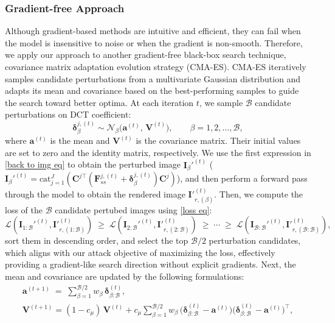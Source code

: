 \documentclass[runningheads]{llncs}
\begin{document}
\subsubsection{Gradient-free Approach}
Although gradient-based methods are intuitive and efficient, they can fail when the model is insensitive to noise or when the gradient is non-smooth. Therefore, we apply our approach to another gradient-free black-box search technique, covariance matrix adaptation evolution strategy (CMA-ES)\cite{hansen2016cma}. CMA-ES iteratively samples candidate perturbations from a multivariate Gaussian distribution and adapts its mean and covariance based on the best-performing samples to guide the search toward better optima. At each iteration $t$, we sample $\mathcal{B}$ candidate perturbations on DCT coefficient:
\begin{equation}
    \bm{\delta}_{\beta}^{j,(t)} \sim \mathcal{N}_\beta\!\bigl(\bm{a}^{(t)},\,\bm{V}^{(t)}\bigr),
\qquad \beta=1,2,\ldots,\mathcal{B},
\end{equation}
where $\bm{a}^{(t)}$ is the mean and $\bm{V}^{(t)}$ is the covariance matrix. Their initial values are set to zero and the identity matrix, respectively. We use the first expression in \cref{back to img eq} to obtain the perturbed image $\bm{I}_\beta'^{(t)}$ ($\bm{I}_\beta'^{(t)}={\text{cat}}_{j=1}^J(\bm{C}^{j\top}(\bm{F}_{ss}^{j,(t)}+\bm{\delta}_{\beta}^{j,(t)})\bm{C}^j)$), and then perform a forward pass through the model to obtain the rendered image $\bm{I}'^{(t)}_{r,(\beta)}$. Then, we compute the loss of the $\mathcal{B}$ candidate pertubed images using \cref{loss eq}:
\begin{equation}
    \mathcal{L}\!\left(\bm{I}_{1:\mathcal{B}}'^{(t)},\bm{I}'^{(t)}_{r,(1:\mathcal{B})}\right)\;\ge\;
\mathcal{L}\!\left(\bm{I}_{2:\mathcal{B}}'^{(t)},\bm{I}'^{(t)}_{r,(2:\mathcal{B})}\right)\;\ge\;\cdots\;\ge\;
\mathcal{L}\!\left(\bm{I}_{\mathcal{B}:\mathcal{B}}'^{(t)},\bm{I}'^{(t)}_{r,(\mathcal{B}:\mathcal{B})}\right),
\end{equation}
sort them in descending order, and select the top $\mathcal{B}/2$ perturbation candidates, which aligns with our attack objective of maximizing the loss, effectively providing a gradient-like search direction without explicit gradients. Next, the mean and covariance are updated by the following formulations:
\begin{gather}
    \bm{a}^{(t+1)} \;=\; \sum_{\beta=1}^{\mathcal{B}/2} w_\beta\,\bm{\delta}^{(t)}_{\beta:\mathcal{B}}, \\
    \bm{V}^{(t+1)}
    = (1-c_{\mu})\,\bm{V}^{(t)}
    + c_{\mu}\sum_{\beta=1}^{\mathcal{B}/2} w_\beta\,
    \bigl(\bm{\delta}^{(t)}_{\beta:\mathcal{B}}-\bm{a}^{(t)}\bigr)
    \bigl(\bm{\delta}^{(t)}_{\beta:\mathcal{B}}-\bm{a}^{(t)}\bigr)^{\top},
\end{gather}
\end{document}

